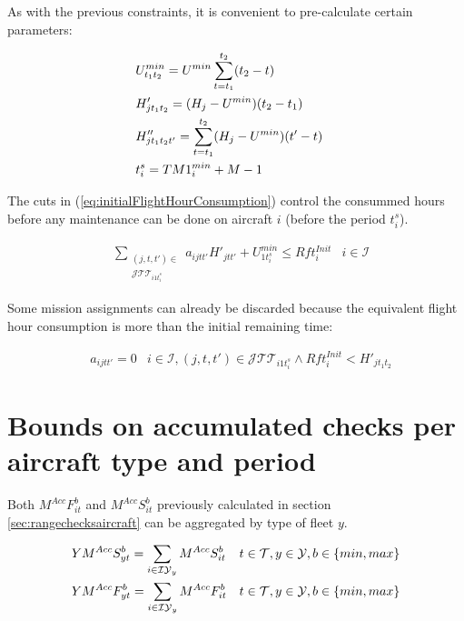 \documentclass[a4paper,onecolumn,fleqn]{article}
\begin{document}
  As with the previous constraints, it is convenient to pre-calculate certain parameters:

  \begin{align}
      & U^{min}_{t_1t_2} = U^{min} \sum_{t=t_1}^{t_2} (t_2 - t) \notag \\
      & H'_{jt_1t_2} = (H_j - U^{min}) (t_2 - t_1) \notag \\
      & H''_{jt_1t_2t'} = \sum_{t=t_1}^{t_2} (H_j- U^{min}) (t' - t) \notag \\
      & t^{s}_i = TM1^{min}_i + M - 1&  \notag
  \end{align}

  The cuts in (\ref{eq:initialFlightHourConsumption}) control the consummed hours before any maintenance can be done on aircraft $i$ (before the period $t^{s}_i$).

  \begin{align}
    & \sum_{\substack{(j, t, t') \in \\ \mathcal{J}\mathcal{T}\mathcal{T}_{i1t^{s}_i}}} a_{ijtt'} H'_{jtt'} + U^{min}_{1t^{s}_i} \leq Rft^{Init}_i
                    & i \in \mathcal{I} \label{eq:initialFlightHourConsumption}
  \end{align}

  Some mission assignments can already be discarded because the equivalent flight hour consumption is more than the initial remaining time:

  \begin{align}
    & a_{ijtt'} = 0 & i \in \mathcal{I}, (j, t, t') \in \mathcal{J}\mathcal{T}\mathcal{T}_{i1t^{s}_i} \land Rft^{Init}_i < H'_{jt_1t_2}
  \end{align}

\section{Bounds on accumulated checks per aircraft type and period} \label{sec:rangecheckstype}
  
  Both $M^{Acc}F^{b}_{it}$ and $M^{Acc}S^{b}_{it}$ previously calculated in section \ref{sec:rangechecksaircraft} can be aggregated by type of fleet $y$.

  \begin{align}
    & YM^{Acc}S^{b}_{yt} = \sum_{i \in \mathcal{IY}_y} M^{Acc}S^{b}_{it} 
        & t \in \mathcal{T}, y \in \mathcal{Y}, b \in \{min, max\} \notag \\
    & YM^{Acc}F^{b}_{yt} = \sum_{i \in \mathcal{IY}_y} M^{Acc}F^{b}_{it} 
        & t \in \mathcal{T}, y \in \mathcal{Y}, b \in \{min, max\} \notag
  \end{align}
\end{document}
